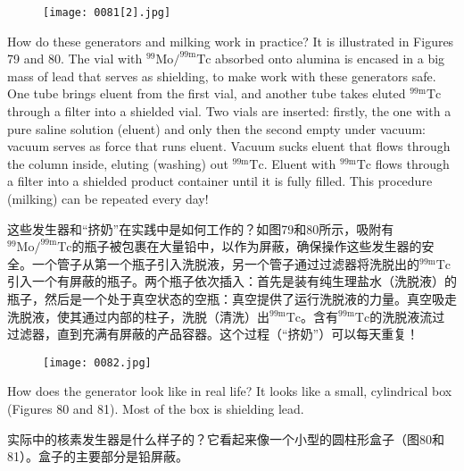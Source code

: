 \documentclass[dvipsnames, svgnames,a4paper,11pt]{article}
\begin{document}
\begin{figure}[ht]
    \centering
    \texttt{[image: 0081[2].jpg]}
     \label{fig78}
\end{figure}

How do these generators and milking work in practice? It is illustrated in Figures 79 and 80. The vial with $^{99}\text{Mo}/^{99\text{m}}\text{Tc}$ absorbed onto alumina is encased in a big mass of lead that serves as shielding, to make work with these generators safe. One tube brings eluent from the first vial, and another tube takes eluted $^{99\text{m}}\text{Tc}$ through a filter into a shielded vial. Two vials are inserted: firstly, the one with a pure saline solution (eluent) and only then the second empty under vacuum: vacuum serves as force that runs eluent. Vacuum sucks eluent that flows through the column inside, eluting (washing) out $^{99\text{m}}\text{Tc}$. Eluent with $^{99\text{m}}\text{Tc}$ flows through a filter into a shielded product container until it is fully filled. This procedure (milking) can be repeated every day!

这些发生器和“挤奶”在实践中是如何工作的？如图79和80所示，吸附有$^{99}\text{Mo}/^{99\text{m}}\text{Tc}$的瓶子被包裹在大量铅中，以作为屏蔽，确保操作这些发生器的安全。一个管子从第一个瓶子引入洗脱液，另一个管子通过过滤器将洗脱出的$^{99\text{m}}\text{Tc}$引入一个有屏蔽的瓶子。两个瓶子依次插入：首先是装有纯生理盐水（洗脱液）的瓶子，然后是一个处于真空状态的空瓶：真空提供了运行洗脱液的力量。真空吸走洗脱液，使其通过内部的柱子，洗脱（清洗）出$^{99\text{m}}\text{Tc}$。含有$^{99\text{m}}\text{Tc}$的洗脱液流过过滤器，直到充满有屏蔽的产品容器。这个过程（“挤奶”）可以每天重复！

\begin{figure}[ht]
    \centering
    \texttt{[image: 0082.jpg]}
     \label{fig79}
\end{figure}

How does the generator look like in real life? It looks like a small, cylindrical box (Figures 80 and 81). Most of the box is shielding lead.

实际中的核素发生器是什么样子的？它看起来像一个小型的圆柱形盒子（图80和81）。盒子的主要部分是铅屏蔽。
\end{document}
